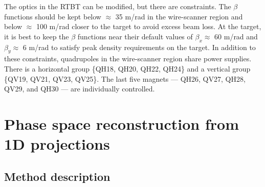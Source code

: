 The optics in the RTBT can be modified, but there are constraints. The $\beta$ functions should be kept below $\approx$ 35 m/rad in the wire-scanner region and below $\approx$ 100 m/rad closer to the target to avoid excess beam loss. At the target, it is best to keep the $\beta$ functions near their default values of $\beta_x \approx$ 60 m/rad and $\beta_y \approx$ 6 m/rad to satisfy peak density requirements on the target. In addition to these constraints, quadrupoles in the wire-scanner region share power supplies. There is a horizontal group \{QH18, QH20, QH22, QH24\} and a vertical group \{QV19, QV21, QV23, QV25\}. The last five magnets — QH26, QV27, QH28, QV29, and QH30 — are individually controlled.


\section{Phase space reconstruction from 1D projections}\label{sec:Phase space reconstruction from 1D projections}

\subsection{Method description}

